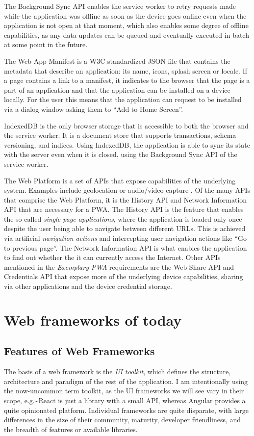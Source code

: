 \documentclass[english,odsaz]{fitthesis}
\begin{document}
The Background Sync API enables the service worker to retry requests made while
the application was offline as soon as the device goes online even when the
application is not open at that moment, which also enables some degree of
offline capabilities, as any data updates can be queued and eventually executed in
batch at some point in the future.

The Web App Manifest is a W3C-standardized JSON file \cite{webapp-manifest} that
contains the metadata that describe an application: its name, icons, splash
screen or locale. If a page contains a link to a manifest, it indicates to the
browser that the page is a part of an application and that the application can
be installed on a device locally. For the user this means that the application
can request to be installed via a dialog window asking them to ``Add to Home
Screen''.

IndexedDB is the only browser storage that is accessible to both the browser and
the service worker. It is a document store that supports transactions, schema
versioning, and indices. Using IndexedDB, the application is able to sync its
state with the server even when it is closed, using the Background Sync API of
the service worker.

The Web Platform is a set of APIs that expose capabilities of the underlying
system. Examples include geolocation or audio/video capture
\cite{what_web_can_do}. Of the many APIs that comprise the Web Platform, it is the
History API and Network Information API that are necessary for a PWA. The
History API is the feature that enables the so-called \emph{single page applications},
where the application is loaded only once despite the user being able to
navigate between different URLs. This is achieved via artificial \emph{navigation
actions} and intercepting user navigation actions like ``Go to previous page''. The
Network Information API is what enables the application to find out whether the
it can currently access the Internet. Other APIs mentioned in the \emph{Exemplary PWA}
requirements are the Web Share API and Credentials API that expose more of the
underlying device capabilities, sharing via other applications and the device
credential storage.

\chapter{Web frameworks of today}
\label{sec:orgbdacd61}
\section{Features of Web Frameworks}
\label{sec:org40313d1}
The basis of a web framework is the \emph{UI toolkit}, which defines the structure,
architecture and paradigm of the rest of the application. I am intentionally
using the now-uncommon term toolkit, as the UI frameworks we will see vary in
their scope, e.g.\textasciitilde{}React is just a library with a small API, whereas Angular
provides a quite opinionated platform. Individual frameworks are quite
disparate, with large differences in the size of their community, maturity,
developer friendliness, and the breadth of features or available libraries.
\end{document}
